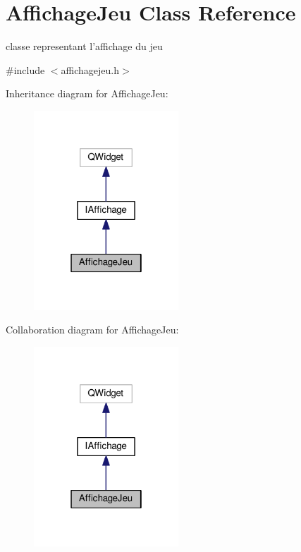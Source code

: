\hypertarget{classAffichageJeu}{\section{Affichage\+Jeu Class Reference}
\label{classAffichageJeu}
}


classe representant l'affichage du jeu  




{\ttfamily \#include $<$affichagejeu.\+h$>$}



Inheritance diagram for Affichage\+Jeu\+:
\nopagebreak
\begin{figure}[H]
\begin{center}
\leavevmode
\includegraphics[width=154pt]{classAffichageJeu__inherit__graph}
\end{center}
\end{figure}


Collaboration diagram for Affichage\+Jeu\+:
\nopagebreak
\begin{figure}[H]
\begin{center}
\leavevmode
\includegraphics[width=154pt]{classAffichageJeu__coll__graph}
\end{center}
\end{figure}
